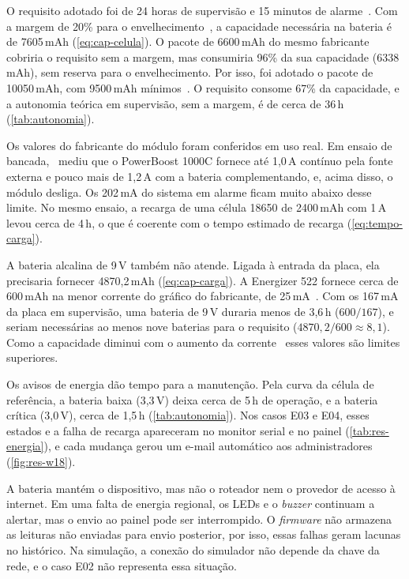 O requisito adotado foi de 24 horas de supervisão e 15 minutos de alarme~\cite[item~5.3]{cbmmg2017it14}. Com a margem de 20\% para o envelhecimento~\cite{hammerberg2021calculation}, a capacidade necessária na bateria é de
7605\,mAh (\autoref{eq:cap-celula}).
O pacote de 6600\,mAh do mesmo fabricante~\cite{adafruit_353} cobriria o
requisito sem a margem, mas consumiria 96\% da sua capacidade
(6338\,mAh), sem reserva para o envelhecimento. Por isso, foi adotado o
pacote de 10050\,mAh, com 9500\,mAh mínimos~\cite{adafruit_5035}. O requisito consome 67\% da capacidade, e a autonomia teórica em
supervisão, sem a margem, é de cerca de 36\,h (\autoref{tab:autonomia}).

Os valores do fabricante do módulo foram conferidos em uso real. Em
ensaio de bancada,~ mediu que o PowerBoost 1000C
fornece até 1,0\,A contínuo pela fonte externa e pouco mais de 1,2\,A
com a bateria complementando, e, acima disso, o módulo desliga. Os 202\,mA
do sistema em alarme ficam muito abaixo desse limite. No mesmo ensaio, a
recarga de uma célula 18650 de 2400\,mAh com 1\,A levou cerca de 4\,h,
o que é coerente com o tempo estimado de recarga
(\autoref{eq:tempo-carga}).

A bateria alcalina de 9\,V também não atende. Ligada à entrada da placa,
ela precisaria fornecer 4870,2\,mAh (\autoref{eq:cap-carga}). A
Energizer 522 fornece cerca de 600\,mAh na menor corrente do gráfico do
fabricante, de 25\,mA~\cite{energizer522}.
Com os 167\,mA da placa em supervisão, uma bateria de 9\,V duraria menos
de 3,6\,h ($600/167$), e seriam necessárias ao menos nove baterias para
o requisito ($4870{,}2/600 \approx 8{,}1$). Como a capacidade diminui com
o aumento da corrente~\cite{energizer522} esses valores são limites
superiores.

Os avisos de energia dão tempo para a manutenção. Pela curva da
célula de referência, a bateria baixa (3,3\,V) deixa cerca de 5\,h de operação, e a
bateria crítica (3,0\,V), cerca de 1,5\,h (\autoref{tab:autonomia}).
Nos casos E03 e E04, esses estados e a falha de recarga apareceram no
monitor serial e no painel (\autoref{tab:res-energia}), e cada mudança
gerou um e-mail automático aos administradores (\autoref{fig:res-w18}).

A bateria mantém o dispositivo, mas não o roteador nem o provedor de
acesso à internet. Em uma falta de energia regional, os LEDs e o
\textit{buzzer} continuam a alertar, mas o envio ao painel pode ser
interrompido.
O \textit{firmware} não armazena as leituras não enviadas para envio posterior, por isso, essas falhas geram lacunas no histórico. Na
simulação, a conexão do simulador não depende da chave da rede, e o caso
E02 não representa essa situação.

